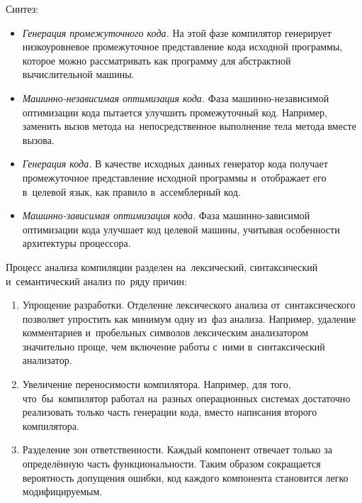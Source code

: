 Синтез:
\begin{itemize}	
\item{\textit{Генерация промежуточного кода.} На этой фазе компилятор генерирует низкоуровневое промежуточное представление кода исходной программы, которое можно рассматривать как программу для абстрактной вычислительной машины.}	
\item{\textit{Машинно-независимая оптимизация кода.} Фаза машинно-независимой оптимизации кода пытается улучшить промежуточный код. Например, заменить вызов метода на~непосредственное выполнение тела метода вместе вызова.}	
\item{\textit{Генерация кода.} В качестве исходных данных генератор кода получает промежуточное представление исходной программы и~отображает его в~целевой язык, как правило в~ассемблерный код.}
\item{\textit{Машинно-зависимая оптимизация кода.} Фаза машинно-зависимой оптимизации кода улучшает код целевой машины, учитывая особенности архитектуры процессора.}		
\end{itemize}


Процесс анализа компиляции разделен на~лексический, синтаксический и~семантический анализ по~ряду причин: 

\begin{enumerate} 
	\item{Упрощение разработки. Отделение лексического анализа от~синтаксического позволяет упростить как минимум одну из~фаз анализа. Например, удаление комментариев и~пробельных символов лексическим анализатором значительно проще, чем включение работы с~ними в~синтаксический анализатор.}
	\item{Увеличение переносимости компилятора. Например, для того, что~бы~компилятор работал на~разных операционных системах достаточно реализовать только часть генерации кода, вместо написания второго компилятора.}
	\item{Разделение зон ответственности. Каждый компонент отвечает только за определённую часть функциональности. Таким образом сокращается вероятность допущения ошибки, код каждого компонента становится легко модифицируемым. }
\end{enumerate}
